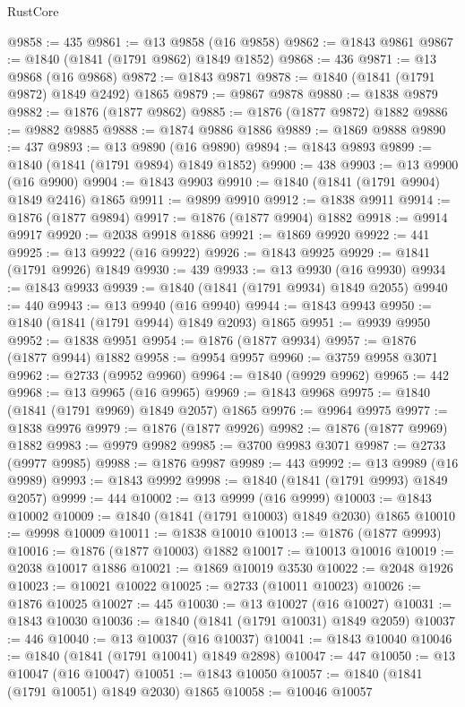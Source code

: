 \begin{lexlean}{RustCore}
\begin{coremodule}
@9858 := 435
@9861 := @13 @9858 (@16 @9858)
@9862 := @1843 @9861
@9867 := @1840 (@1841 (@1791 @9862) @1849 @1852)
@9868 := 436
@9871 := @13 @9868 (@16 @9868)
@9872 := @1843 @9871
@9878 := @1840 (@1841 (@1791 @9872) @1849 @2492) @1865
@9879 := @9867 @9878
@9880 := @1838 @9879
@9882 := @1876 (@1877 @9862)
@9885 := @1876 (@1877 @9872) @1882
@9886 := @9882 @9885
@9888 := @1874 @9886 @1886
@9889 := @1869 @9888
@9890 := 437
@9893 := @13 @9890 (@16 @9890)
@9894 := @1843 @9893
@9899 := @1840 (@1841 (@1791 @9894) @1849 @1852)
@9900 := 438
@9903 := @13 @9900 (@16 @9900)
@9904 := @1843 @9903
@9910 := @1840 (@1841 (@1791 @9904) @1849 @2416) @1865
@9911 := @9899 @9910
@9912 := @1838 @9911
@9914 := @1876 (@1877 @9894)
@9917 := @1876 (@1877 @9904) @1882
@9918 := @9914 @9917
@9920 := @2038 @9918 @1886
@9921 := @1869 @9920
@9922 := 441
@9925 := @13 @9922 (@16 @9922)
@9926 := @1843 @9925
@9929 := @1841 (@1791 @9926) @1849
@9930 := 439
@9933 := @13 @9930 (@16 @9930)
@9934 := @1843 @9933
@9939 := @1840 (@1841 (@1791 @9934) @1849 @2055)
@9940 := 440
@9943 := @13 @9940 (@16 @9940)
@9944 := @1843 @9943
@9950 := @1840 (@1841 (@1791 @9944) @1849 @2093) @1865
@9951 := @9939 @9950
@9952 := @1838 @9951
@9954 := @1876 (@1877 @9934)
@9957 := @1876 (@1877 @9944) @1882
@9958 := @9954 @9957
@9960 := @3759 @9958 @3071
@9962 := @2733 (@9952 @9960)
@9964 := @1840 (@9929 @9962)
@9965 := 442
@9968 := @13 @9965 (@16 @9965)
@9969 := @1843 @9968
@9975 := @1840 (@1841 (@1791 @9969) @1849 @2057) @1865
@9976 := @9964 @9975
@9977 := @1838 @9976
@9979 := @1876 (@1877 @9926)
@9982 := @1876 (@1877 @9969) @1882
@9983 := @9979 @9982
@9985 := @3700 @9983 @3071
@9987 := @2733 (@9977 @9985)
@9988 := @1876 @9987
@9989 := 443
@9992 := @13 @9989 (@16 @9989)
@9993 := @1843 @9992
@9998 := @1840 (@1841 (@1791 @9993) @1849 @2057)
@9999 := 444
@10002 := @13 @9999 (@16 @9999)
@10003 := @1843 @10002
@10009 := @1840 (@1841 (@1791 @10003) @1849 @2030) @1865
@10010 := @9998 @10009
@10011 := @1838 @10010
@10013 := @1876 (@1877 @9993)
@10016 := @1876 (@1877 @10003) @1882
@10017 := @10013 @10016
@10019 := @2038 @10017 @1886
@10021 := @1869 @10019 @3530
@10022 := @2048 @1926
@10023 := @10021 @10022
@10025 := @2733 (@10011 @10023)
@10026 := @1876 @10025
@10027 := 445
@10030 := @13 @10027 (@16 @10027)
@10031 := @1843 @10030
@10036 := @1840 (@1841 (@1791 @10031) @1849 @2059)
@10037 := 446
@10040 := @13 @10037 (@16 @10037)
@10041 := @1843 @10040
@10046 := @1840 (@1841 (@1791 @10041) @1849 @2898)
@10047 := 447
@10050 := @13 @10047 (@16 @10047)
@10051 := @1843 @10050
@10057 := @1840 (@1841 (@1791 @10051) @1849 @2030) @1865
@10058 := @10046 @10057

\end{coremodule}
\end{lexlean}
